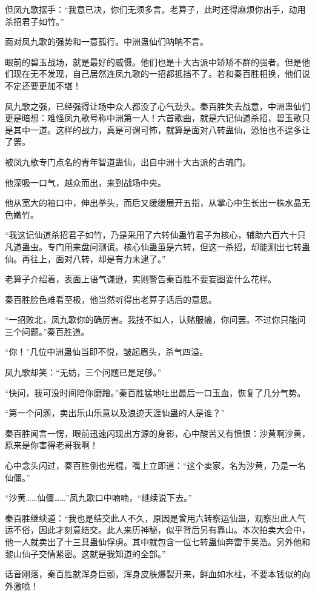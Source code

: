 \begin{this_body}
但凤九歌摆手：“我意已决，你们无须多言。老算子，此时还得麻烦你出手，动用杀招君子如竹。”

面对凤九歌的强势和一意孤行。中洲蛊仙们呐呐不言。

眼前的碧玉战场，就是最好的威慑。他们也是十大古派中矫矫不群的强者。但是他们现在无不发现，自己居然连凤九歌的一招都抵挡不了。若和秦百胜相换，他们说不定还要更加不堪！

凤九歌之强，已经强得让场中众人都没了心气劲头。秦百胜失去战意，中洲蛊仙们更是暗想：难怪凤九歌号称中洲第一人！六首歌曲，就是六记仙道杀招，碧玉歌只是其中一道。这样的战力，真是可谓可怖，就算是面对八转蛊仙，恐怕也不遑多让了罢。

被凤九歌专门点名的青年智道蛊仙，出自中洲十大古派的古魂门。

他深吸一口气，越众而出，来到战场中央。

他从宽大的袖口中，伸出拳头，而后又缓缓展开五指，从掌心中生长出一株水晶无色嫩竹。

“我这记仙道杀招君子如竹，乃是采用了六转仙蛊竹君子为核心，辅助六百六十只凡道蛊虫。专门用来盘问测谎。核心仙蛊虽是六转，但这一杀招，却能测出七转蛊仙。再往上，面对八转，却是有力未逮了。”

老算子介绍着，表面上语气谦逊，实则警告秦百胜不要妄图耍什么花样。

秦百胜脸色难看至极，他当然听得出老算子话后的意思。

“一招败北，凤九歌你的确厉害。我技不如人，认赌服输，你问罢。不过你只能问三个问题。”秦百胜道。

“你！”几位中洲蛊仙当即不悦，皱起眉头，杀气四溢。

凤九歌却笑：“无妨，三个问题已是足够。”

“快问，我可没时间陪你磨蹭。”秦百胜猛地吐出最后一口玉血，恢复了几分气势。

“第一个问题，卖出乐山乐意以及浪迹天涯仙蛊的人是谁？”

秦百胜闻言一愣，眼前迅速闪现出方源的身影，心中酸苦又有愤恨：沙黄啊沙黄，原来是你害得老哥我啊！

心中念头闪过，秦百胜倒也光棍，嘴上立即道：“这个卖家，名为沙黄，乃是一名仙僵。”

“沙黄……仙僵……”凤九歌口中喃喃，“继续说下去。”

秦百胜继续道：“我也是结交此人不久，原因是曾用六转察运仙蛊，观察出此人气运不俗，因此才刻意结交。此人来历神秘，似乎背后另有靠山。本次拍卖大会中，他一人就卖出了十三具蛊仙俘虏。其中就包含一位七转蛊仙奔雷手吴浩。另外他和黎山仙子交情紧密。这就是我知道的全部。”

话音刚落，秦百胜就浑身巨颤，浑身皮肤爆裂开来，鲜血如水柱，不要本钱似的向外激喷！


\end{this_body}
